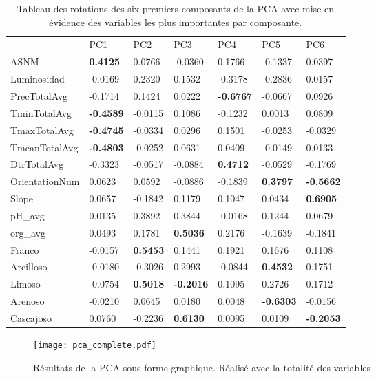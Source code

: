 \begin{table}[]
	\centering
	\begin{tabular}{lllllll}
		& PC1     & PC2     & PC3     & PC4     & PC5     & PC6     \\
		ASNM           & \textbf{0.4125}  & 0.0766  & -0.0360 & 0.1766  & -0.1337 & 0.0397  \\
		Luminosidad    & -0.0169 & 0.2320  & 0.1532  & -0.3178 & -0.2836 & 0.0157  \\
		PrecTotalAvg   & -0.1714 & 0.1424  & 0.0222  & \textbf{-0.6767} & -0.0667 & 0.0926  \\
		TminTotalAvg   & \textbf{-0.4589} & -0.0115 & 0.1086  & -0.1232 & 0.0013  & 0.0809  \\
		TmaxTotalAvg   & \textbf{-0.4745} & -0.0334 & 0.0296  & 0.1501  & -0.0253 & -0.0329 \\
		TmeanTotalAvg  & \textbf{-0.4803} & -0.0252 & 0.0631  & 0.0409  & -0.0149 & 0.0133  \\
		DtrTotalAvg    & -0.3323 & -0.0517 & -0.0884 & \textbf{0.4712}  & -0.0529 & -0.1769 \\
		OrientationNum & 0.0623  & 0.0592  & -0.0886 & -0.1839 & \textbf{0.3797}  & \textbf{-0.5662} \\
		Slope          & 0.0657  & -0.1842 & 0.1179  & 0.1047  & 0.0434  & \textbf{0.6905}  \\
		pH\_avg        & 0.0135  & 0.3892  & 0.3844  & -0.0168 & 0.1244  & 0.0679  \\
		org\_avg       & 0.0493  & 0.1781  & \textbf{0.5036}  & 0.2176  & -0.1639 & -0.1841 \\
		Franco         & -0.0157 & \textbf{0.5453}  & 0.1441  & 0.1921  & 0.1676  & 0.1108  \\
		Arcilloso      & -0.0180 & -0.3026 & 0.2993  & -0.0844 & \textbf{0.4532}  & 0.1751  \\
		Limoso         & -0.0754 & \textbf{0.5018}  & \textbf{-0.2016} & 0.1095  & 0.2726  & 0.1712  \\
		Arenoso        & -0.0210 & 0.0645  & 0.0180  & 0.0048  & \textbf{-0.6303} & -0.0156 \\
		Cascajoso      & 0.0760  & -0.2236 & \textbf{0.6130}  & 0.0095  & 0.0109  & \textbf{-0.2053}
	\end{tabular}
	\caption{\label{TablePCAResult1}Tableau des rotations des six premiers composants de la PCA avec mise en évidence des variables les plus importantes par composante.}
\end{table}


\begin{figure}[H]
	\texttt{[image: pca\_complete.pdf]}
	\caption{\label{FigurePCAResult1} Résultats de la PCA sous forme graphique. Réalisé avec la totalité des variables }
\end{figure}


